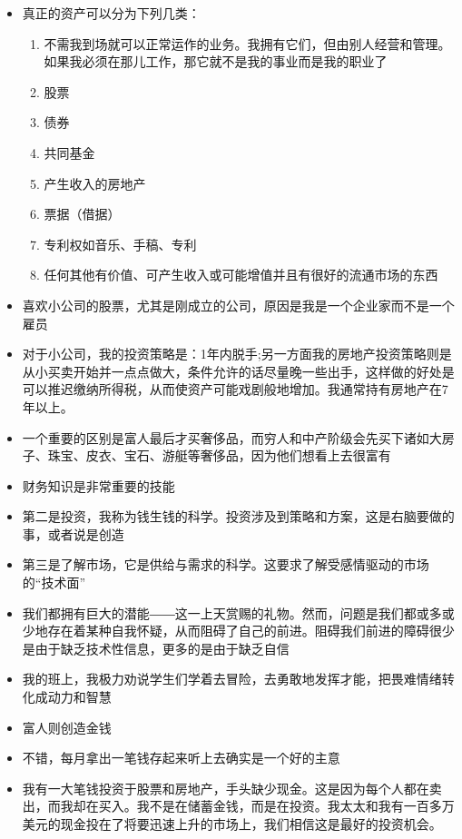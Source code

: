 \documentclass[UTF8,a4paper,8pt]{ctexart}
\begin{document}
\begin{itemize}
 	\item 真正的资产可以分为下列几类：
 	\begin{enumerate}
 		\item 不需我到场就可以正常运作的业务。我拥有它们，但由别人经营和管理。如果我必须在那儿工作，那它就不是我的事业而是我的职业了
 		\item 股票
 		\item 债券
 		\item 共同基金
 		\item 产生收入的房地产
 		\item 票据（借据）
 		\item 专利权如音乐、手稿、专利
 		\item 任何其他有价值、可产生收入或可能增值并且有很好的流通市场的东西
 	\end{enumerate}
 	\item 喜欢小公司的股票，尤其是刚成立的公司，原因是我是一个企业家而不是一个雇员
 	\item 对于小公司，我的投资策略是：1年内脱手;另一方面我的房地产投资策略则是从小买卖开始并一点点做大，条件允许的话尽量晚一些出手，这样做的好处是可以推迟缴纳所得税，从而使资产可能戏剧般地增加。我通常持有房地产在7年以上。
 	\item 一个重要的区别是富人最后才买奢侈品，而穷人和中产阶级会先买下诸如大房子、珠宝、皮衣、宝石、游艇等奢侈品，因为他们想看上去很富有
 	\item 财务知识是非常重要的技能
 	\item 第二是投资，我称为钱生钱的科学。投资涉及到策略和方案，这是右脑要做的事，或者说是创造
 	\item 第三是了解市场，它是供给与需求的科学。这要求了解受感情驱动的市场的“技术面”
 	\item 我们都拥有巨大的潜能――这一上天赏赐的礼物。然而，问题是我们都或多或少地存在着某种自我怀疑，从而阻碍了自己的前进。阻碍我们前进的障碍很少是由于缺乏技术性信息，更多的是由于缺乏自信
 	\item 我的班上，我极力劝说学生们学着去冒险，去勇敢地发挥才能，把畏难情绪转化成动力和智慧
 	\item 富人则创造金钱
 	\item 不错，每月拿出一笔钱存起来听上去确实是一个好的主意
 	\item 我有一大笔钱投资于股票和房地产，手头缺少现金。这是因为每个人都在卖出，而我却在买入。我不是在储蓄金钱，而是在投资。我太太和我有一百多万美元的现金投在了将要迅速上升的市场上，我们相信这是最好的投资机会。

\end{itemize}
\end{document}
